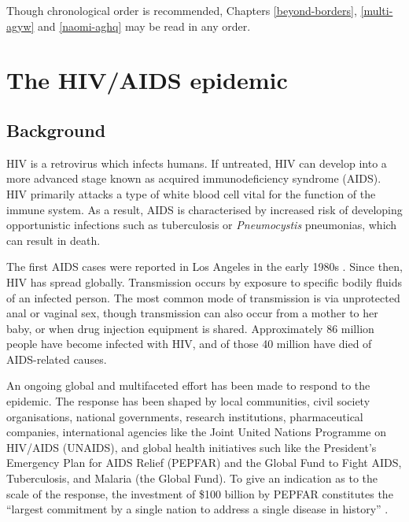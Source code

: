 \documentclass[a4paper, nobind]{templates/ociamthesis}
\begin{document}
Though chronological order is recommended, Chapters \ref{beyond-borders}, \ref{multi-agyw} and \ref{naomi-aghq} may be read in any order.

\hypertarget{hiv-aids}{%
\chapter{The HIV/AIDS epidemic}\label{hiv-aids}}

\adjustmtc
{}

\hypertarget{background}{%
\section{Background}\label{background}}

HIV is a retrovirus which infects humans.
If untreated, HIV can develop into a more advanced stage known as acquired immunodeficiency syndrome (AIDS).
HIV primarily attacks a type of white blood cell vital for the function of the immune system.
As a result, AIDS is characterised by increased risk of developing opportunistic infections such as tuberculosis or \emph{Pneumocystis} pneumonias, which can result in death.

The first AIDS cases were reported in Los Angeles in the early 1980s \autocite{gottlieb1981pneumocystis,barre1983isolation}.
Since then, HIV has spread globally.
Transmission occurs by exposure to specific bodily fluids of an infected person.
The most common mode of transmission is via unprotected anal or vaginal sex, though transmission can also occur from a mother to her baby, or when drug injection equipment is shared.
Approximately 86 million people have become infected with HIV, and of those 40 million have died of AIDS-related causes.

An ongoing global and multifaceted effort has been made to respond to the epidemic.
The response has been shaped by local communities, civil society organisations, national governments, research institutions, pharmaceutical companies, international agencies like the Joint United Nations Programme
on HIV/AIDS (UNAIDS), and global health initiatives such like the President's Emergency Plan for AIDS Relief (PEPFAR) and the Global Fund to Fight AIDS, Tuberculosis, and Malaria (the Global Fund).
To give an indication as to the scale of the response, the investment of \$100 billion by PEPFAR constitutes the ``largest commitment by a single nation to address a single disease in history'' \autocite{pepfar2022}.
\end{document}
